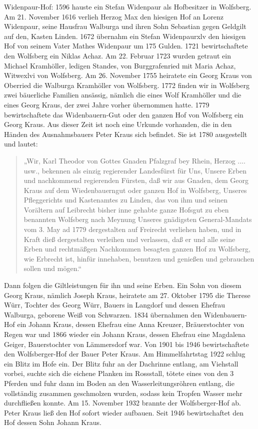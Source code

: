 \documentclass{book}
\begin{document}
Widenpaur-Hof: 1596 hauste ein Stefan Widenpaur als Hofbesitzer in Wolfsberg. Am
21. November 1616 verlieh Herzog Max den hiesigen Hof an Lorenz Widenpaur, seine
Hausfrau Walburga und ihren Sohn Sebastian gegen Geldgilt auf den, Kasten
Linden. 1672 übernahm ein Stefan Widenpaurxlv den hiesigen Hof von seinem Vater
Mathes Widenpaur um 175 Gulden. 1721 bewirtschaftete den Wolfsberg ein Niklas
Achaz. Am 22. Februar 1723 wurden getraut ein Michael Kramhöller, ledigen
Standes, von Burggrafenried mit Maria Achaz, Witwexlvi von Wolfsberg. Am 26.
November 1755 heiratete ein Georg Kraus von Oberried die Walburga Kramhöller von
Wolfsberg. 1772 finden wir in Wolfsberg zwei bäuerliche Familien ansässig,
nämlich die eines Wolf Kramhöller und die eines Georg Kraus, der zwei Jahre
vorher übernommen hatte. 1779 bewirtschaftete das Widenbauern-Gut oder den
ganzen Hof von Wolfsberg ein Georg Kraus. Aus dieser Zeit ist noch eine Urkunde
vorhanden, die in den Händen des Ausnahmsbauers Peter Kraus sich befindet. Sie
ist 1780 ausgestellt und lautet:

\begin{quote}
„Wir, Karl Theodor von Gottes Gnaden Pfalzgraf bey Rhein, Herzog .... usw.,
bekennen als einzig regierender Landesfürst für Uns, Unsere Erben und
nachkommend regierenden Fürsten, daß wir aus Gnaden, dem Georg Kraus auf dem
Wiedenbauerngut oder ganzen Hof in Wolfsberg, Unseres Pfleggerichts und
Kastenamtes zu Linden, das von ihm und seinen Vorältern auf Leibrecht bisher
inne gehabte ganze Hofsgut zu eben benannten Wolfsberg nach Meynung Unseres
gnädigsten General-Mandats vom 3. May ad 1779 dergestalten auf Freirecht
verliehen haben, und in Kraft dieß dergestalten verleihen und verlassen, daß er
und alle seine Erben und rechtmäßgen Nachkommen besagten ganzen Hof zu
Wolfsberg, wie Erbrecht ist, hinfür innehaben, benutzen und genießen und
gebrauchen sollen und mögen.“
\end{quote}

Dann folgen die Giltleistungen für ihn und seine Erben. Ein Sohn von diesem
Georg Kraus, nämlich Joseph Kraus, heiratete am 27. Oktober 1795 die Therese
Würr, Tochter des Georg Würr, Bauers in Langdorf und dessen Ehefrau Walburga,
geborene Weiß von Schwarzen. 1834 übernahmen den Widenbauern-Hof ein Johann
Kraus, dessen Ehefrau eine Anna Kreuzer, Bräuerstochter von Regen war und 1866
wieder ein Johann Kraus, dessen Ehefrau eine Magdalena Geiger, Bauerstochter von
Lämmersdorf war. Von 1901 bis 1946 bewirtschaftete den Wolfsberger-Hof der Bauer
Peter Kraus. Am Himmelfahrtstag 1922 schlug ein Blitz im Hofe ein. Der Blitz
fuhr an der Dachrinne entlang, am Viehstall vorbei, suchte sich die eichene
Planken im Rossstall, tötete eines von den 3 Pferden und fuhr dann im Boden an
den Wasserleitungsröhren entlang, die vollständig zusammen geschmolzen wurden,
sodass kein Tropfen Wasser mehr durchfließen konnte. Am 15. November 1932
brannte der Wolfsberger-Hof ab. Peter Kraus ließ den Hof sofort wieder aufbauen.
Seit 1946 bewirtschaftet den Hof dessen Sohn Johann Kraus.
\end{document}
